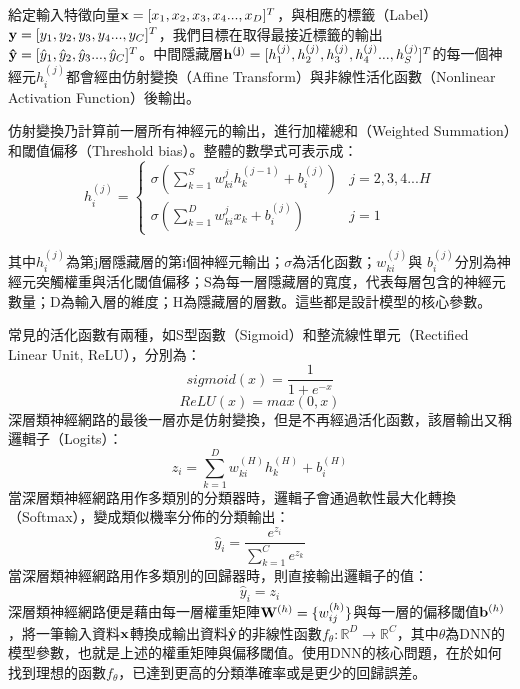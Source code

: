 給定輸入特徵向量$\bold{x} = [x_1 , x_2 , x_3 , x_4 ... , x_D]^T$，與相應的標籤（Label）$\bold{y} = [y_1 , y_2 , y_3 , y_4 ... ,y_C]^T$，我們目標在取得最接近標籤的輸出$\bold{\hat{y}} = [\hat{y}_1 , \hat{y}_2 , \hat{y}_3 ... , \hat{y}_C]^T$。中間隱藏層$\bold{h^{(j)}} = [h^{(j)}_1 , h^{(j)}_2 , h^{(j)}_3 , h^{(j)}_4 ... , h^{(j)}_S]^T$的每一個神經元$h^{(j)}_{i}$都會經由仿射變換（Affine Transform）與非線性活化函數（Nonlinear Activation Function）後輸出。

仿射變換乃計算前一層所有神經元的輸出，進行加權總和（Weighted Summation）和閾值偏移（Threshold bias）。整體的數學式可表示成：
\begin{equation}
h^{(j)}_{i} =
\left\{\begin{matrix}
 \sigma (\sum_{k=1}^{S} w_{ki}^{j}h_{k}^{(j-1)} + b_{i}^{(j)}) & j = 2 , 3 , 4 ... H \\ 
 \sigma (\sum_{k=1}^{D} w_{ki}^{j}x_{k} + b_{i}^{(j)}) & j = 1 
\end{matrix}\right.
\end{equation}

其中$h_i^{(j)}$為第j層隱藏層的第i個神經元輸出；$\sigma$為活化函數；$w_{ki}^{(j)}$與 $b_{i}^{(j)}$分別為神經元突觸權重與活化閾值偏移；S為每一層隱藏層的寬度，代表每層包含的神經元數量；D為輸入層的維度；H為隱藏層的層數。這些都是設計模型的核心參數。

常見的活化函數有兩種，如S型函數（Sigmoid）和整流線性單元（Rectified Linear Unit, ReLU），分別為：
\begin{equation}
sigmoid(x) = \frac{1}{1 + e^{-x}}
\end{equation}
\begin{equation}
ReLU(x) = max( 0 , x )
\end{equation}
深層類神經網路的最後一層亦是仿射變換，但是不再經過活化函數，該層輸出又稱邏輯子（Logits）：
\begin{equation}
z_i = \sum_{k=1}^{D} w_{ki}^{(H)}h_{k}^{(H)} + b_{i}^{(H)} 
\end{equation}
當深層類神經網路用作多類別的分類器時，邏輯子會通過軟性最大化轉換（Softmax），變成類似機率分佈的分類輸出：
\begin{equation} \label{eq:softmax}
\hat{y}_i = \frac{e^{z_i}}{\sum_{k=1}^{C}e^{z_k} }
\end{equation}
當深層類神經網路用作多類別的回歸器時，則直接輸出邏輯子的值：
\begin{equation}
\hat{y}_i = z_i 
\end{equation}
深層類神經網路便是藉由每一層權重矩陣$\bold{W}^{(h)} = \{w_{ij}^{(h)}\}$與每一層的偏移閾值$\bold{b}^{(h)}$，將一筆輸入資料$\bold{x}$轉換成輸出資料$\hat{\bold{y}}$的非線性函數$f_{\theta}:\mathbb{R}^D\rightarrow \mathbb{R}^C$，其中$\theta$為DNN的模型參數，也就是上述的權重矩陣與偏移閾值。使用DNN的核心問題，在於如何找到理想的函數$f_{\theta}$，已達到更高的分類準確率或是更少的回歸誤差。
